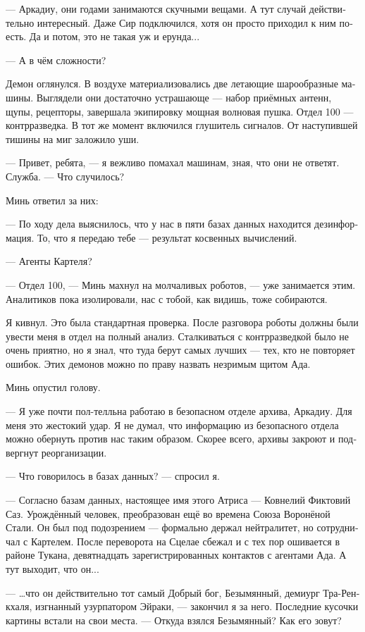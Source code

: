 \documentclass[a4paper,12pt,fleqn]{book}\usepackage{cooltooltips}\usepackage{polyglossia}\setdefaultlanguage[babelshorthands=true]{russian}\setotherlanguage{english}\defaultfontfeatures{Ligatures=TeX,Mapping=tex-text} \usepackage{xcolor}\definecolor{lightgray}{HTML}{bbbbbb}\color{lightgray}\newcommand{\ml}[3]{\textenglish{\textcolor{black}{#3}}}
\begin{document}
{--- Аркадиу, они годами занимаются скучными вещами.
А тут случай действительно интересный.
Даже Сир подключился, хотя он просто приходил к ним поесть.
Да и потом, это не такая уж и ерунда...

--- А в чём сложности?

Демон оглянулся.
В воздухе материализовались две летающие шарообразные машины.
Выглядели они достаточно устрашающе --- набор приёмных антенн, щупы, рецепторы, завершала экипировку мощная волновая пушка.
Отдел 100 --- контрразведка.
В тот же момент включился глушитель сигналов.
От наступившей тишины на миг заложило уши.

--- Привет, ребята, --- я вежливо помахал машинам, зная, что они не ответят.
Служба.
--- Что случилось?

Минь ответил за них:

--- По ходу дела выяснилось, что у нас в пяти базах данных находится дезинформация.
То, что я передаю тебе --- результат косвенных вычислений.

--- Агенты Картеля?

--- Отдел 100, --- Минь махнул на молчаливых роботов, --- уже занимается этим.
Аналитиков пока изолировали, нас с тобой, как видишь, тоже собираются.

Я кивнул.
Это была стандартная проверка.
После разговора роботы должны были увести меня в отдел на полный анализ.
Сталкиваться с контрразведкой было не очень приятно, но я знал, что туда берут самых лучших --- тех, кто не повторяет ошибок.
Этих демонов можно по праву назвать незримым щитом Ада.

Минь опустил голову.

--- Я уже почти пол-телльна работаю в безопасном отделе архива, Аркадиу.
Для меня это жестокий удар.
Я не думал, что информацию из безопасного отдела можно обернуть против нас таким образом.
Скорее всего, архивы закроют и подвергнут реорганизации.

--- Что говорилось в базах данных? --- спросил я.

--- Согласно базам данных, настоящее имя этого Атриса --- Ковнелий Фиктовий Саз.
Урождённый человек, преобразован ещё во времена Союза Воронёной Стали.
Он был под подозрением --- формально держал нейтралитет, но сотрудничал с Картелем.
После переворота на Сцелае сбежал и с тех пор ошивается в районе Тукана, девятнадцать зарегистрированных контактов с агентами Ада.
А тут выходит, что он...

--- \ldots что он действительно тот самый Добрый бог, Безымянный, демиург Тра-Ренкхаля, изгнанный узурпатором Эйраки, --- закончил я за него.
Последние кусочки картины встали на свои места.
--- Откуда взялся Безымянный?
Как его зовут?

}
\end{document}
